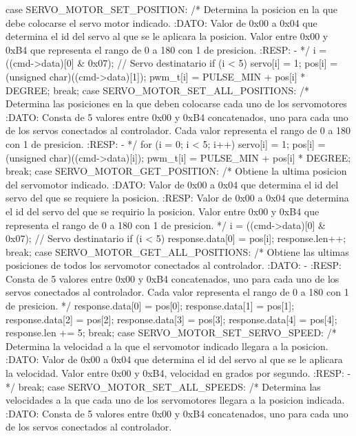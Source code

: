 {\begin{verbatimtab}
{{ 		case SERVO_MOTOR_SET_POSITION:
			/* Determina la posicion en la que debe colocarse el 
			servo motor indicado.
			:DATO:
			Valor de 0x00 a 0x04 que determina el id del servo al
			que se le aplicara la posicion. Valor entre 0x00 y 0xB4
			que representa el rango de 0 a 180 con 1 de presicion.
			:RESP:
			-
			*/
			i = ((cmd->data)[0] & 0x07); // Servo destinatario
			if (i < 5)
			{
				servo[i] = 1;
				pos[i] = (unsigned char)((cmd->data)[1]);
				pwm_t[i] = PULSE_MIN + pos[i] * DEGREE;
			}	
		break;
 		case SERVO_MOTOR_SET_ALL_POSITIONS:
			/* Determina las posiciones en la que deben colocarse
			cada uno de los servomotores
			:DATO:
			Consta de 5 valores entre 0x00 y 0xB4 concatenados, uno
			para cada uno de los servos conectados al controlador.
			Cada valor representa el rango de 0 a 180 con 1 de presicion.
			:RESP:
			-
			*/
			for (i = 0; i < 5; i++)
			{
				servo[i] = 1;
				pos[i] = (unsigned char)((cmd->data)[i]);
				pwm_t[i] = PULSE_MIN + pos[i] * DEGREE;
			}	
		break;
 		case SERVO_MOTOR_GET_POSITION:
			/* Obtiene la ultima posicion del servomotor indicado.
			:DATO:
			Valor de 0x00 a 0x04 que determina el id del servo del que
			se requiere la posicion.
			:RESP:
			Valor de 0x00 a 0x04 que determina el id del servo del que 
			se requirio la posicion. Valor entre 0x00 y 0xB4 que representa
			el rango de 0 a 180 con 1 de presicion.
			*/
			i = ((cmd->data)[0] & 0x07); // Servo destinatario
			if (i < 5)
			{
				response.data[0] = pos[i];
				response.len++;
			}	
		break;
 		case SERVO_MOTOR_GET_ALL_POSITIONS:
			/* Obtiene las ultimas posiciones de todos los servomotor
			conectados al controlador.
			:DATO:
			-
			:RESP:
			Consta de 5 valores entre 0x00 y 0xB4 concatenados, uno para 
			cada uno de los servos conectados al controlador. Cada valor 
			representa el rango de 0 a 180 con 1 de presicion.
			*/
			response.data[0] = pos[0];
			response.data[1] = pos[1];
			response.data[2] = pos[2];
			response.data[3] = pos[3];
			response.data[4] = pos[4];
			response.len += 5;
		break;
		case SERVO_MOTOR_SET_SERVO_SPEED:
			/* Determina la velocidad a la que el servomotor indicado 
			llegara a la posicion.
			:DATO:
			Valor de 0x00 a 0x04 que determina el id del servo al que 
			se le aplicara la velocidad. Valor entre 0x00 y 0xB4, 
			velocidad en grados por segundo.
			:RESP:
			-
			*/
		break;
 		case SERVO_MOTOR_SET_ALL_SPEEDS:
			/* Determina las velocidades a la que cada uno de los 
			servomotores llegara a la posicion indicada.
			:DATO:
			Consta de 5 valores entre 0x00 y 0xB4 concatenados, uno 
			para cada uno de los servos conectados al controlador. 
}}
\end{verbatimtab}}
